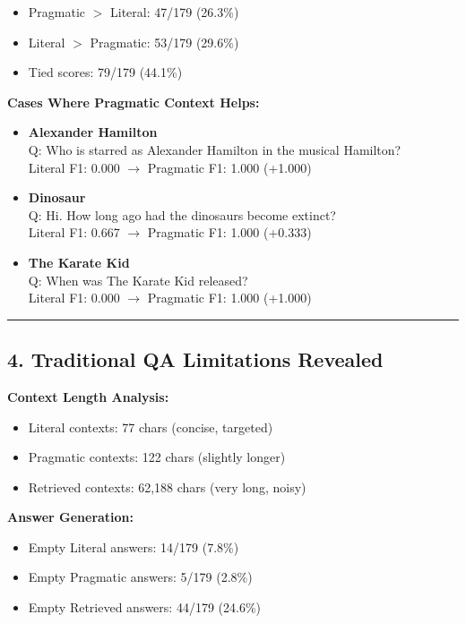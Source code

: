 \documentclass[12pt, letterpaper]{article}
\begin{document}
\begin{itemize}
    \item Pragmatic $>$ Literal: 47/179 (26.3\%)
    \item Literal $>$ Pragmatic: 53/179 (29.6\%)
    \item Tied scores: 79/179 (44.1\%)
\end{itemize}

\noindent \textbf{Cases Where Pragmatic Context Helps:}
\begin{itemize}
    \item \textbf{Alexander Hamilton} \\
          Q: Who is starred as Alexander Hamilton in the musical Hamilton? \\
          Literal F1: 0.000 $\rightarrow$ Pragmatic F1: 1.000 (+1.000)

    \item \textbf{Dinosaur} \\
          Q: Hi. How long ago had the dinosaurs become extinct? \\
          Literal F1: 0.667 $\rightarrow$ Pragmatic F1: 1.000 (+0.333)

    \item \textbf{The Karate Kid} \\
          Q: When was The Karate Kid released? \\
          Literal F1: 0.000 $\rightarrow$ Pragmatic F1: 1.000 (+1.000)
\end{itemize}

\bigskip
\hrule
\subsection*{4. Traditional QA Limitations Revealed}
{}

\noindent \textbf{Context Length Analysis:}
\begin{itemize}
    \item Literal contexts: 77 chars (concise, targeted)
    \item Pragmatic contexts: 122 chars (slightly longer)
    \item Retrieved contexts: 62,188 chars (very long, noisy)
\end{itemize}

\noindent \textbf{Answer Generation:}
\begin{itemize}
    \item Empty Literal answers: 14/179 (7.8\%)
    \item Empty Pragmatic answers: 5/179 (2.8\%)
    \item Empty Retrieved answers: 44/179 (24.6\%)
\end{itemize}
\end{document}
